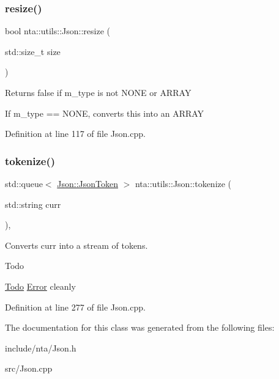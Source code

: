 \subsubsection{\texorpdfstring{resize()}{resize()}}
{\footnotesize\ttfamily bool nta\+::utils\+::\+Json\+::resize (\begin{DoxyParamCaption}\item[{std\+::size\+\_\+t}]{size }\end{DoxyParamCaption})}

Returns false if m\+\_\+type is not N\+O\+NE or A\+R\+R\+AY

If m\+\_\+type == N\+O\+NE, converts this into an A\+R\+R\+AY 

Definition at line 117 of file Json.\+cpp.

\mbox{\label{classnta_1_1utils_1_1Json_a905d67b125a7aadd771bb74a1bb63f34}} 
\subsubsection{\texorpdfstring{tokenize()}{tokenize()}}
{\footnotesize\ttfamily std\+::queue$<$ \hyperlink{structnta_1_1utils_1_1Json_1_1JsonToken}{Json\+::\+Json\+Token} $>$ nta\+::utils\+::\+Json\+::tokenize (\begin{DoxyParamCaption}\item[{std\+::string}]{curr }\end{DoxyParamCaption})\hspace{0.3cm}{\ttfamily [static]}, {\ttfamily [private]}}



Converts curr into a stream of tokens. 

\begin{DoxyRefDesc}{Todo}
\item[\hyperlink{todo__todo000026}{Todo}]\hyperlink{structnta_1_1Error}{Error} cleanly \end{DoxyRefDesc}


Definition at line 277 of file Json.\+cpp.



The documentation for this class was generated from the following files\+:\begin{DoxyCompactItemize}
\item 
include/nta/Json.\+h\item 
src/Json.\+cpp\end{DoxyCompactItemize}
